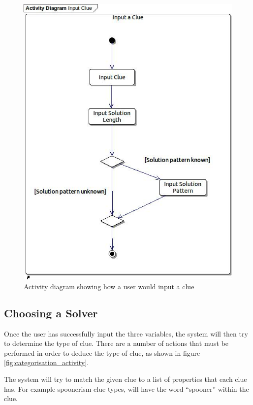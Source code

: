 \begin{figure}[H]
  \centering
  \includegraphics[scale=0.6]{design/activity/input_clue.jpg}
  \caption{Activity diagram showing how a user would input a clue}
  \label{fig:input_activity}
\end{figure}


\subsection{Choosing a Solver} 
\label{sub:categorisation}

Once the user has successfully input the three variables, the system will then 
try to determine the type of clue. There are a number of actions that must be 
performed in order to deduce the type of clue, as shown in figure 
\ref{fig:categorisation_activity}.

The system will try to match the given clue to a list of properties that each 
clue has. For example spoonerism clue types, will have the word ``spooner''
within the clue.

